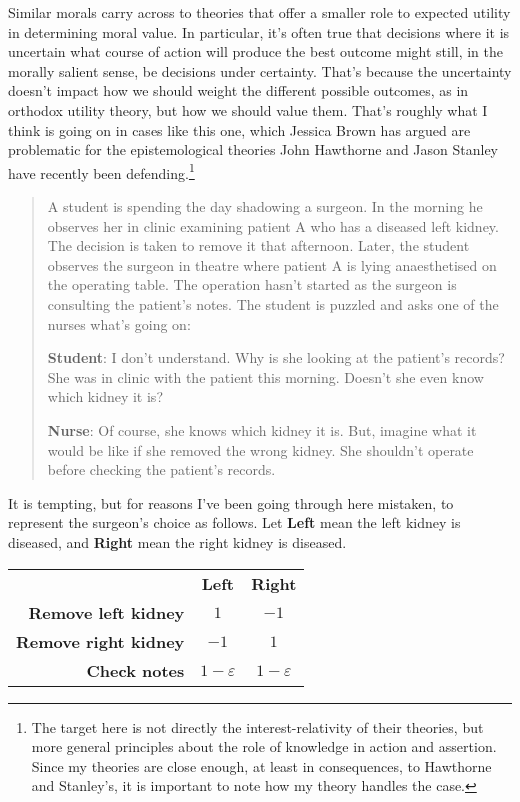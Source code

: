 Similar morals carry across to theories that offer a smaller role to expected utility in determining moral value. In particular, it's often true that decisions where it is uncertain what course of action will produce the best outcome might still, in the morally salient sense, be decisions under certainty. That's because the uncertainty doesn't impact how we should weight the different possible outcomes, as in orthodox utility theory, but how we should value them. That's roughly what I think is going on in cases like this one, which Jessica Brown has argued are problematic for the epistemological theories John Hawthorne and Jason Stanley have recently been defending.\footnote{The target here is not directly the interest-relativity of their theories, but more general principles about the role of knowledge in action and assertion. Since my theories are close enough, at least in consequences, to Hawthorne and Stanley's, it is important to note how my theory handles the case.}

\begin{quote}
A student is spending the day shadowing a surgeon. In the morning he observes her in clinic examining patient A who has a diseased left kidney. The decision is taken to remove it that afternoon. Later, the student observes the surgeon in theatre where patient A is lying anaesthetised on the operating table. The operation hasn't started as the surgeon is consulting the patient's notes. The student is puzzled and asks one of the nurses what's going on: 

\textbf{Student}: I don't understand. Why is she looking at the patient's records? She was in clinic with the patient this morning. Doesn't she even know which kidney it is? 

\textbf{Nurse}: Of course, she knows which kidney it is. But, imagine what it would be like if she removed the wrong kidney. She shouldn't operate before checking the patient's records. \citep[1144-1145]{Brown2008-BROKAP}
\end{quote}

\noindent It is tempting, but for reasons I've been going through here mistaken, to represent the surgeon's choice as follows. Let \textbf{Left} mean the left kidney is diseased, and \textbf{Right} mean the right kidney is diseased.

\begin{center}
\begin{tabular}{r c c}
 & \textbf{Left} & \textbf{Right} \\
\textbf{Remove left kidney} & $1$ & $-1$ \\
\textbf{Remove right kidney} & $-1$ & $1$ \\
\textbf{Check notes} & $1-\varepsilon$ & $1-\varepsilon$ \\
\end{tabular}
\end{center}

